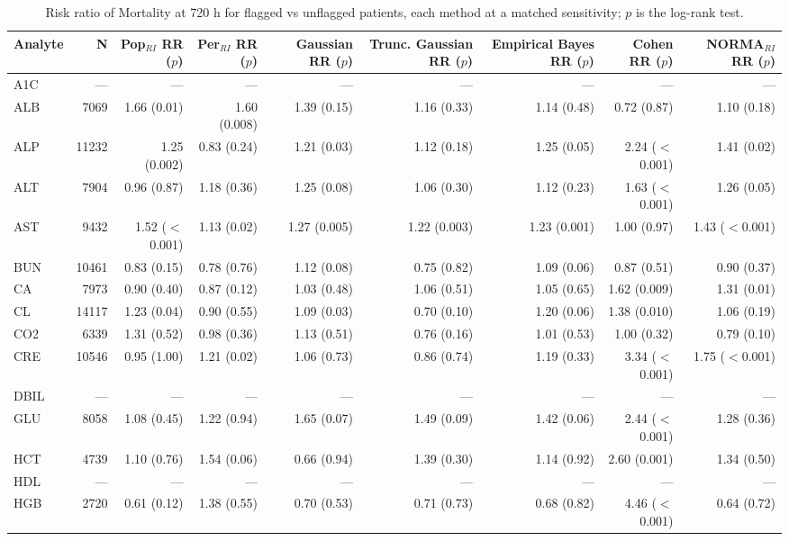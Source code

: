 \begin{table}[ht]
\centering
\footnotesize
\caption{Risk ratio of Mortality at 720 h for flagged vs unflagged patients, each method at a matched sensitivity; $p$ is the log-rank test.}
\begin{tabular}{lrrrrrrrr}
\toprule
Analyte & N & Pop$_{RI}$ RR ($p$) & Per$_{RI}$ RR ($p$) & Gaussian RR ($p$) & Trunc. Gaussian RR ($p$) & Empirical Bayes RR ($p$) & Cohen RR ($p$) & NORMA$_{RI}$ RR ($p$) \\
\midrule
A1C & --- & --- & --- & --- & --- & --- & --- & --- \\
ALB & 7069 & 1.66 (0.01) & 1.60 (0.008) & 1.39 (0.15) & 1.16 (0.33) & 1.14 (0.48) & 0.72 (0.87) & 1.10 (0.18) \\
ALP & 11232 & 1.25 (0.002) & 0.83 (0.24) & 1.21 (0.03) & 1.12 (0.18) & 1.25 (0.05) & 2.24 ($<$0.001) & 1.41 (0.02) \\
ALT & 7904 & 0.96 (0.87) & 1.18 (0.36) & 1.25 (0.08) & 1.06 (0.30) & 1.12 (0.23) & 1.63 ($<$0.001) & 1.26 (0.05) \\
AST & 9432 & 1.52 ($<$0.001) & 1.13 (0.02) & 1.27 (0.005) & 1.22 (0.003) & 1.23 (0.001) & 1.00 (0.97) & 1.43 ($<$0.001) \\
BUN & 10461 & 0.83 (0.15) & 0.78 (0.76) & 1.12 (0.08) & 0.75 (0.82) & 1.09 (0.06) & 0.87 (0.51) & 0.90 (0.37) \\
CA & 7973 & 0.90 (0.40) & 0.87 (0.12) & 1.03 (0.48) & 1.06 (0.51) & 1.05 (0.65) & 1.62 (0.009) & 1.31 (0.01) \\
CL & 14117 & 1.23 (0.04) & 0.90 (0.55) & 1.09 (0.03) & 0.70 (0.10) & 1.20 (0.06) & 1.38 (0.010) & 1.06 (0.19) \\
CO2 & 6339 & 1.31 (0.52) & 0.98 (0.36) & 1.13 (0.51) & 0.76 (0.16) & 1.01 (0.53) & 1.00 (0.32) & 0.79 (0.10) \\
CRE & 10546 & 0.95 (1.00) & 1.21 (0.02) & 1.06 (0.73) & 0.86 (0.74) & 1.19 (0.33) & 3.34 ($<$0.001) & 1.75 ($<$0.001) \\
DBIL & --- & --- & --- & --- & --- & --- & --- & --- \\
GLU & 8058 & 1.08 (0.45) & 1.22 (0.94) & 1.65 (0.07) & 1.49 (0.09) & 1.42 (0.06) & 2.44 ($<$0.001) & 1.28 (0.36) \\
HCT & 4739 & 1.10 (0.76) & 1.54 (0.06) & 0.66 (0.94) & 1.39 (0.30) & 1.14 (0.92) & 2.60 (0.001) & 1.34 (0.50) \\
HDL & --- & --- & --- & --- & --- & --- & --- & --- \\
HGB & 2720 & 0.61 (0.12) & 1.38 (0.55) & 0.70 (0.53) & 0.71 (0.73) & 0.68 (0.82) & 4.46 ($<$0.001) & 0.64 (0.72) \\

\end{tabular}
\end{table}
